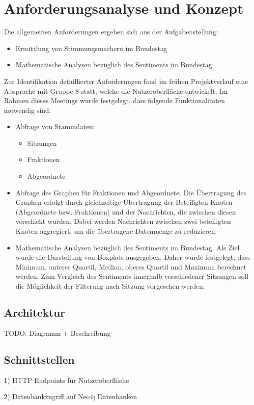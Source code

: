 \section{Anforderungsanalyse und Konzept}\label{sec:07_03_anforderungen_konzept}

Die allgemeinen Anforderungen ergeben sich aus der Aufgabenstellung:
\begin{itemize}
  \item Ermittlung von Stimmungsmachern im Bundestag
  \item Mathematische Analysen bezüglich des Sentiments im Bundestag
\end{itemize}

Zur Identifikation detaillierter Anforderungen fand im frühen Projektverlauf eine Absprache mit Gruppe 8 statt, welche die Nutzeroberfläche entwickelt.
Im Rahmen dieses Meetings wurde festgelegt, dass folgende Funktionalitäten notwendig sind:
\begin{itemize}
  \item Abfrage von Stammdaten:
    \begin{itemize}
      \item Sitzungen
      \item Fraktionen
      \item Abgeordnete
    \end{itemize}
  \item Abfrage des Graphen für Fraktionen und Abgeordnete. Die Übertragung des Graphen erfolgt durch gleichzeitige Übertragung der Beteiligten Knoten (Abgeordnete bzw. Fraktionen) und der Nachrichten, die zwischen diesen verschickt wurden. Dabei werden Nachrichten zwischen zwei beteiligten Knoten aggregiert, um die übertragene Datenmenge zu reduzieren.
  \item Mathematische Analysen bezüglich des Sentiments im Bundestag. Als Ziel wurde die Darstellung von Boxplots ausgegeben. Daher wurde festgelegt, dass Minimum, unteres Quartil, Median, oberes Quartil und Maximum berechnet werden. Zum Vergleich des Sentiments innerhalb verschiedener Sitzungen soll die Möglichkeit der Filterung nach Sitzung vorgesehen werden.
\end{itemize}



\subsection{Architektur}

TODO: Diagramm + Beschreibung

\subsection{Schnittstellen}

1) HTTP Endpoints für Nutzeroberfläche

2) Datenbankzugriff auf Neo4j Datenbanken
